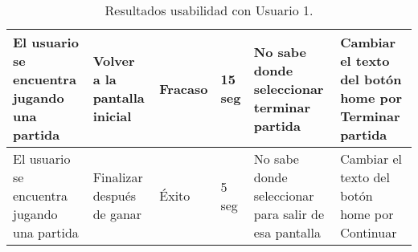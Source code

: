 \begin{table}
\begin{center}
\begin{tabular}{|p{2.5cm}|p{1.75cm}|p{1.25cm}|p{1.25cm}|p{2.75cm}|p{3.5cm}|}
      \hline
      El usuario se encuentra jugando una partida
      & Volver a la pantalla inicial
      & Fracaso
      & 15 seg
      & No sabe donde seleccionar terminar partida
      & Cambiar el texto del botón home por Terminar partida\\

      \hline
      El usuario se encuentra jugando una partida
      & Finalizar después de ganar
      & Éxito
      & 5 seg
      & No sabe donde seleccionar para salir de esa pantalla
      & Cambiar el texto del botón home por Continuar\\

      \hline

    \end{tabular}

    \caption{Resultados usabilidad con Usuario 1.}
    \label{tabla-bocetos-usuario1}

  \end{center}
\end{table}


